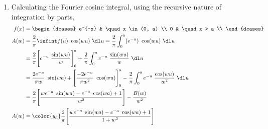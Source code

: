 \begin{enumerate}
    \item Calculating the Fourier cosine integral, using the recursive nature of
          integration by parts,
          \begin{align}
              f(x) & = \begin{dcases}
                           e^{-x} & \quad x \in (0, a) \\
                           0      & \quad x > a        \\
                       \end{dcases}                                \\
              A(w) & = \frac{2}{\pi} \infint f(u)\ \cos(wu)\ \dl u
              = \frac{2}{\pi} \int_{0}^{a} (e^{-u})\ \cos(wu)\ \dl u              \\
                   & = \frac{2}{\pi} \Bigg[ e^{-u}\ \frac{\sin(wu)}{w} \Bigg]_0^a
              + \frac{2}{\pi}\int_{0}^{a} e^{-u}\ \frac{\sin(wu)}{w}\ \dl u       \\
                   & = \frac{2e^{-a}}{\pi w}\ \sin(wa)
              + \Bigg[ \frac{-2e^{-u}}{\pi w^2}\ \cos(wu) \Bigg]_0^a
              - \frac{2}{\pi}\int_{0}^{a} e^{-u}\ \frac{\cos(wu)}{w^2}\ \dl u     \\
                   & = \frac{2}{\pi}\Bigg[\frac{we^{-a}\ \sin(wa)
              - e^{-a}\ \cos(wa) + 1}{w^2}\Bigg] - \frac{B(w)}{w^2}               \\
              A(w) & = \color{y_h} \frac{2}{\pi}\Bigg[\frac{we^{-a}\ \sin(wa)
                      - e^{-a}\ \cos(wa) + 1}{1 + w^2}\Bigg]
          \end{align}


\end{enumerate}
